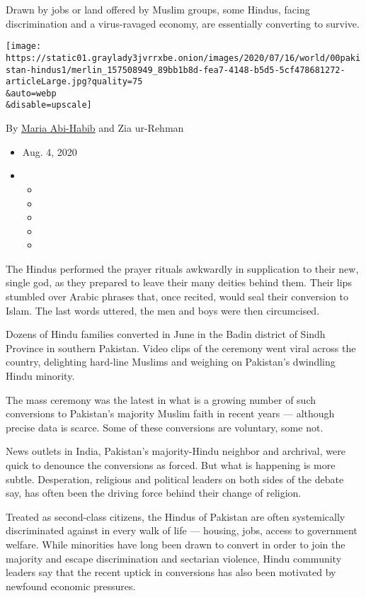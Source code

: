Drawn by jobs or land offered by Muslim groups, some Hindus, facing
discrimination and a virus-ravaged economy, are essentially converting
to survive.

\texttt{[image: https://static01.graylady3jvrrxbe.onion/images/2020/07/16/world/00pakistan-hindus1/merlin\_157508949\_89bb1b8d-fea7-4148-b5d5-5cf478681272-articleLarge.jpg?quality=75\\\&auto=webp\\\&disable=upscale]}

By \href{https://www.nytimes3xbfgragh.onion/by/maria-abi-habib}{Maria
Abi-Habib} and Zia ur-Rehman

\begin{itemize}
\item
  Aug. 4, 2020
\item
  \begin{itemize}
  \item
  \item
  \item
  \item
  \item
  \end{itemize}
\end{itemize}

The Hindus performed the prayer rituals awkwardly in supplication to
their new, single god, as they prepared to leave their many deities
behind them. Their lips stumbled over Arabic phrases that, once recited,
would seal their conversion to Islam. The last words uttered, the men
and boys were then circumcised.

Dozens of Hindu families converted in June in the Badin district of
Sindh Province in southern Pakistan. Video clips of the ceremony went
viral across the country, delighting hard-line Muslims and weighing on
Pakistan's dwindling Hindu minority.

The mass ceremony was the latest in what is a growing number of such
conversions to Pakistan's majority Muslim faith in recent years ---
although precise data is scarce. Some of these conversions are
voluntary, some not.

News outlets in India, Pakistan's majority-Hindu neighbor and archrival,
were quick to denounce the conversions as forced. But what is happening
is more subtle. Desperation, religious and political leaders on both
sides of the debate say, has often been the driving force behind their
change of religion.

Treated as second-class citizens, the Hindus of Pakistan are often
systemically discriminated against in every walk of life --- housing,
jobs, access to government welfare. While minorities have long been
drawn to convert in order to join the majority and escape discrimination
and sectarian violence, Hindu community leaders say that the recent
uptick in conversions has also been motivated by newfound economic
pressures.

